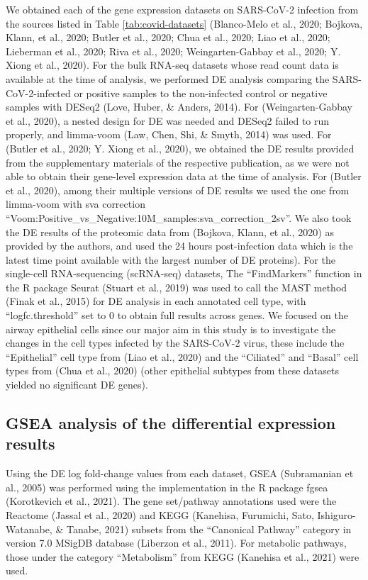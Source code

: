 \documentclass[12pt,twoside,openany,\mydriver]{thesis}  %
\begin{document}
We obtained each of the gene expression datasets on SARS-CoV-2 infection from the sources listed in Table \ref{tab:covid-datasets} (Blanco-Melo et al., 2020; Bojkova, Klann, et al., 2020; Butler et al., 2020; Chua et al., 2020; Liao et al., 2020; Lieberman et al., 2020; Riva et al., 2020; Weingarten-Gabbay et al., 2020; Y. Xiong et al., 2020). For the bulk RNA-seq datasets whose read count data is available at the time of analysis, we performed DE analysis comparing the SARS-CoV-2-infected or positive samples to the non-infected control or negative samples with DESeq2 (Love, Huber, \& Anders, 2014). For (Weingarten-Gabbay et al., 2020), a nested design for DE was needed and DESeq2 failed to run properly, and limma-voom (Law, Chen, Shi, \& Smyth, 2014) was used. For (Butler et al., 2020; Y. Xiong et al., 2020), we obtained the DE results provided from the supplementary materials of the respective publication, as we were not able to obtain their gene-level expression data at the time of analysis. For (Butler et al., 2020), among their multiple versions of DE results we used the one from limma-voom with sva correction ``Voom:Positive\_vs\_Negative:10M\_samples:sva\_correction\_2sv''. We also took the DE results of the proteomic data from (Bojkova, Klann, et al., 2020) as provided by the authors, and used the 24 hours post-infection data which is the latest time point available with the largest number of DE proteins). For the single-cell RNA-sequencing (scRNA-seq) datasets, The ``FindMarkers'' function in the R package Seurat (Stuart et al., 2019) was used to call the MAST method (Finak et al., 2015) for DE analysis in each annotated cell type, with ``logfc.threshold'' set to 0 to obtain full results across genes. We focused on the airway epithelial cells since our major aim in this study is to investigate the changes in the cell types infected by the SARS-CoV-2 virus, these include the ``Epithelial'' cell type from (Liao et al., 2020) and the ``Ciliated'' and ``Basal'' cell types from (Chua et al., 2020) (other epithelial subtypes from these datasets yielded no significant DE genes).

\hypertarget{gsea-analysis-of-the-differential-expression-results}{%
\subsection{GSEA analysis of the differential expression results}\label{gsea-analysis-of-the-differential-expression-results}}

Using the DE log fold-change values from each dataset, GSEA (Subramanian et al., 2005) was performed using the implementation in the R package fgsea (Korotkevich et al., 2021). The gene set/pathway annotations used were the Reactome (Jassal et al., 2020) and KEGG (Kanehisa, Furumichi, Sato, Ishiguro-Watanabe, \& Tanabe, 2021) subsets from the ``Canonical Pathway'' category in version 7.0 MSigDB database (Liberzon et al., 2011). For metabolic pathways, those under the category ``Metabolism'' from KEGG (Kanehisa et al., 2021) were used.
\end{document}
